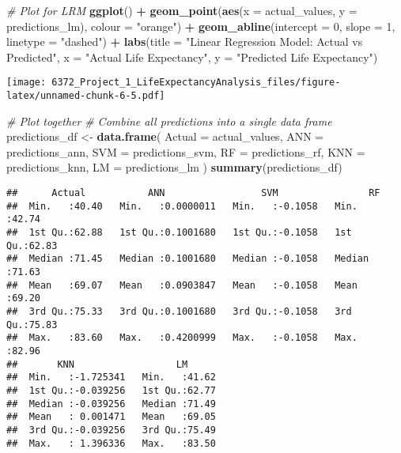 \documentclass[
]{article}
\newenvironment{Shaded}{\begin{snugshade}}{\end{snugshade}}
\newcommand{\AttributeTok}[1]{\textcolor[rgb]{0.13,0.29,0.53}{#1}}
\newcommand{\CommentTok}[1]{\textcolor[rgb]{0.56,0.35,0.01}{\textit{#1}}}
\newcommand{\DecValTok}[1]{\textcolor[rgb]{0.00,0.00,0.81}{#1}}
\newcommand{\FunctionTok}[1]{\textcolor[rgb]{0.13,0.29,0.53}{\textbf{#1}}}
\newcommand{\NormalTok}[1]{#1}
\newcommand{\OtherTok}[1]{\textcolor[rgb]{0.56,0.35,0.01}{#1}}
\newcommand{\SpecialCharTok}[1]{\textcolor[rgb]{0.81,0.36,0.00}{\textbf{#1}}}
\newcommand{\StringTok}[1]{\textcolor[rgb]{0.31,0.60,0.02}{#1}}
\begin{document}
\begin{Shaded}
\begin{Highlighting}[]
\CommentTok{\# Plot for LRM }
\FunctionTok{ggplot}\NormalTok{() }\SpecialCharTok{+}
  \FunctionTok{geom\_point}\NormalTok{(}\FunctionTok{aes}\NormalTok{(}\AttributeTok{x =}\NormalTok{ actual\_values, }\AttributeTok{y =}\NormalTok{ predictions\_lm), }\AttributeTok{colour =} \StringTok{"orange"}\NormalTok{) }\SpecialCharTok{+}
  \FunctionTok{geom\_abline}\NormalTok{(}\AttributeTok{intercept =} \DecValTok{0}\NormalTok{, }\AttributeTok{slope =} \DecValTok{1}\NormalTok{, }\AttributeTok{linetype =} \StringTok{"dashed"}\NormalTok{) }\SpecialCharTok{+}
  \FunctionTok{labs}\NormalTok{(}\AttributeTok{title =} \StringTok{"Linear Regression Model: Actual vs Predicted"}\NormalTok{, }\AttributeTok{x =} \StringTok{"Actual Life Expectancy"}\NormalTok{, }\AttributeTok{y =} \StringTok{"Predicted Life Expectancy"}\NormalTok{)}
\end{Highlighting}
\end{Shaded}

\texttt{[image: 6372\_Project\_1\_LifeExpectancyAnalysis\_files/figure-latex/unnamed-chunk-6-5.pdf]}

\begin{Shaded}
\begin{Highlighting}[]
\CommentTok{\# Plot together}
\CommentTok{\# Combine all predictions into a single data frame}
\NormalTok{predictions\_df }\OtherTok{\textless{}{-}} \FunctionTok{data.frame}\NormalTok{(}
  \AttributeTok{Actual =}\NormalTok{ actual\_values,}
  \AttributeTok{ANN =}\NormalTok{ predictions\_ann,}
  \AttributeTok{SVM =}\NormalTok{ predictions\_svm,}
  \AttributeTok{RF =}\NormalTok{ predictions\_rf,}
  \AttributeTok{KNN =}\NormalTok{ predictions\_knn,}
  \AttributeTok{LM =}\NormalTok{ predictions\_lm}
\NormalTok{)}
\FunctionTok{summary}\NormalTok{(predictions\_df)}
\end{Highlighting}
\end{Shaded}

\begin{verbatim}
##      Actual           ANN                 SVM                RF       
##  Min.   :40.40   Min.   :0.0000011   Min.   :-0.1058   Min.   :42.74  
##  1st Qu.:62.88   1st Qu.:0.1001680   1st Qu.:-0.1058   1st Qu.:62.83  
##  Median :71.45   Median :0.1001680   Median :-0.1058   Median :71.63  
##  Mean   :69.07   Mean   :0.0903847   Mean   :-0.1058   Mean   :69.20  
##  3rd Qu.:75.33   3rd Qu.:0.1001680   3rd Qu.:-0.1058   3rd Qu.:75.83  
##  Max.   :83.60   Max.   :0.4200999   Max.   :-0.1058   Max.   :82.96  
##       KNN                  LM       
##  Min.   :-1.725341   Min.   :41.62  
##  1st Qu.:-0.039256   1st Qu.:62.77  
##  Median :-0.039256   Median :71.49  
##  Mean   : 0.001471   Mean   :69.05  
##  3rd Qu.:-0.039256   3rd Qu.:75.49  
##  Max.   : 1.396336   Max.   :83.50
\end{verbatim}
\end{document}

